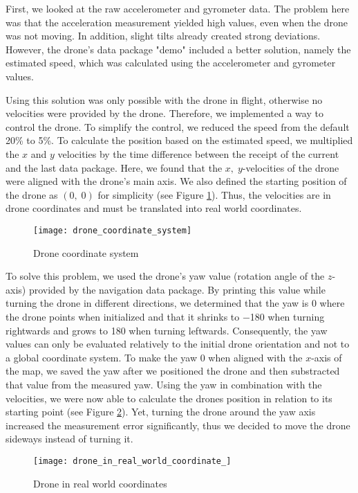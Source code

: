 \documentclass[12pt]{article}
\begin{document}
First, we looked at the raw accelerometer and gyrometer data. The problem here was that the acceleration measurement yielded high values, even when the drone was not moving. In addition, slight tilts already created strong deviations. However, the drone's data package "demo" included a better solution, namely the estimated speed, which was calculated using the accelerometer and gyrometer values.

Using this solution was only possible with the drone in flight, otherwise no velocities were provided by the drone. Therefore, we implemented a way to control the drone. To simplify the control, we reduced the speed from the default \num{20}\% to \num{5}\%. To calculate the position based on the estimated speed, we multiplied the \(x\) and \(y\) velocities by the time difference between the receipt of the current and the last data package. Here, we found that the \(x,\; y\)-velocities of the drone were aligned with the drone's main axis. We also defined the starting position of the drone as \((0,\; 0)\) for simplicity (see Figure \ref{fig:drone_coordinate}). Thus, the velocities are in drone coordinates and must be translated into real world coordinates.

\begin{figure}[htbp]
  \centering
  \texttt{[image: drone\_coordinate\_system]}
  \caption{Drone coordinate system}
  \label{fig:drone_coordinate}
\end{figure}

To solve this problem, we used the drone's yaw value (rotation angle of the \(z\)-axis) provided by the navigation data package. By printing this value while turning the drone in different directions, we determined that the yaw is \num{0} where the drone points when initialized and that it shrinks to \num{-180} when turning rightwards and grows to \num{180} when turning leftwards. Consequently, the yaw values can only be evaluated relatively to the initial drone orientation and not to a global coordinate system. To make the yaw \num{0} when aligned with the \(x\)-axis of the map, we saved the yaw after we positioned the drone and then substracted that value from the measured yaw. Using the yaw in combination with the velocities, we were now able to calculate the drones position in relation to its starting point (see Figure \ref{fig:drone_real}). Yet, turning the drone around the yaw axis increased the measurement error significantly, thus we decided to move the drone sideways instead of turning it.

\begin{figure}[htbp]
  \centering
  \texttt{[image: drone\_in\_real\_world\_coordinate\_]}
  \caption{Drone in real world coordinates}
  \label{fig:drone_real}
\end{figure}
\end{document}
